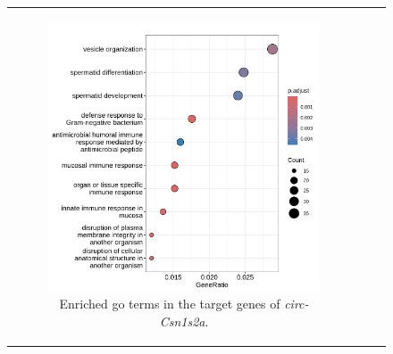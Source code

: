 \begin{figure}[H] \begin{tabular}{ccc} \begin{subfigure}{0.5\textwidth}
                  \centering

                  \includegraphics[width=\linewidth]{chapters/4_results_and_discussion/figures/dea/deseq2/letrozole/chr5:87925915-87926842_targets.txt.png}
                  \caption{Enriched \gls{go} terms in the target
                      genes of \textit{circ-Csn1s2a}.
                  }
                  \label{fig:tg_csn1s2a}
              \end{subfigure}
        \begin{subfigure}{0.5\textwidth}
            \centering


\end{subfigure}
\end{tabular}
\end{figure}
